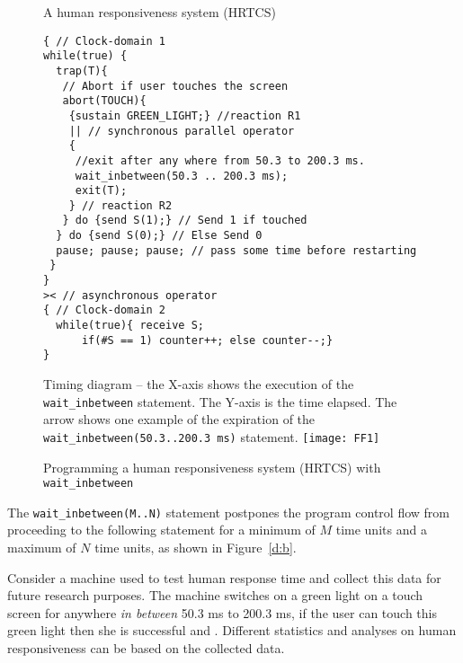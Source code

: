 \begin{figure}[t!]
	\vspace{-10pt}
        \begin{SubFloat}{\label{delay:a}A human responsiveness
            system (HRTCS)}
        \begin{lstlisting}[style=sysj,morekeywords={sustain,send,receive,abort,await,emit,present,trap,pause,exit,wait_inbetween,wait_exact,suspend}]
{ // Clock-domain 1
while(true) {
  trap(T){
   // Abort if user touches the screen
   abort(TOUCH){
    {sustain GREEN_LIGHT;} //reaction R1
    || // synchronous parallel operator
    {
     //exit after any where from 50.3 to 200.3 ms.
     wait_inbetween(50.3 .. 200.3 ms); 
     exit(T); 
    } // reaction R2
   } do {send S(1);} // Send 1 if touched 
  } do {send S(0);} // Else Send 0
  pause; pause; pause; // pass some time before restarting
 }
}
>< // asynchronous operator
{ // Clock-domain 2
  while(true){ receive S; 
      if(#S == 1) counter++; else counter--;}
}
\end{lstlisting}
\end{SubFloat}
\begin{SubFloat}{\label{d:b}Timing diagram -- the X-axis shows the
    execution of the \texttt{wait\_inbetween} statement. The Y-axis is
    the time elapsed. The arrow shows one example of the expiration of
    the \mbox{\texttt{wait\_inbetween(50.3..200.3 ms)}} statement.}
    \centering
    \texttt{[image: FF1]}
\end{SubFloat}
\caption{Programming a human responsiveness system (HRTCS) with
  \texttt{wait\_inbetween}}
\label{fig:1}
\end{figure}

The \texttt{wait\_inbetween(M..N)} statement postpones the program
control flow from proceeding to the following statement for a minimum of
$M$ time units and a maximum of $N$ time units, as shown in
Figure~\ref{d:b}.

Consider a machine used to test human response time and collect this
data for future research purposes. The machine switches on a green light
on a touch screen for anywhere \textit{in between} 50.3 ms to 200.3 ms,
if the user can touch this green light then she is successful and . Different statistics and analyses on human
responsiveness can be based on the collected data.

